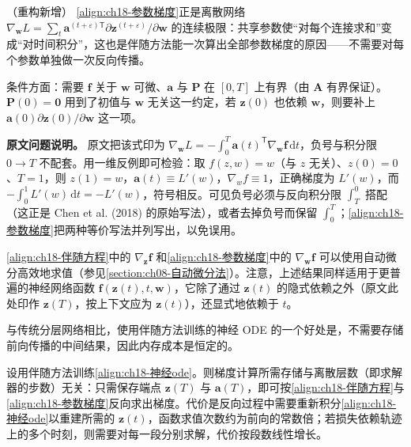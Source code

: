 \documentclass[../../main.tex]{subfiles}
\begin{document}
\begin{remark}（重构新增）
\eqref{align:ch18-参数梯度}正是离散网络 $\nabla_{\bm{w}}L=\sum_{t}\bm{a}^{(t+\varepsilon)\mathsf T}\partial\bm{z}^{(t+\varepsilon)}/\partial\bm{w}$ 的连续极限：共享参数使“对每个连接求和”变成“对时间积分”，这也是伴随方法能一次算出全部参数梯度的原因——不需要对每个参数单独做一次反向传播。

条件方面：需要 $\bm{f}$ 关于 $\bm{w}$ 可微、$\bm{a}$ 与 $\bm{P}$ 在 $[0,T]$ 上有界（由 $\bm{A}$ 有界保证）。$\bm{P}(0)=\bm{0}$ 用到了初值与 $\bm{w}$ 无关这一约定，若 $\bm{z}(0)$ 也依赖 $\bm{w}$，则要补上 $\bm{a}(0)\partial\bm{z}(0)/\partial\bm{w}$ 这一项。

\textbf{原文问题说明。} 原文把该式印为 $\nabla_{\bm{w}}L=-\int_{0}^{T}\bm{a}(t)^{\mathsf T}\nabla_{\bm{w}}\bm{f}\,\mathrm{d}t$，负号与积分限 $0\to T$ 不配套。用一维反例即可检验：取 $f(z,w)=w$（与 $z$ 无关）、$z(0)=0$、$T=1$，则 $z(1)=w$，$\bm{a}(t)\equiv L'(w)$，$\nabla_{w}f\equiv1$，正确梯度为 $L'(w)$，而 $-\int_{0}^{1}L'(w)\,\mathrm{d}t=-L'(w)$，符号相反。可见负号必须与反向积分限 $\int_{T}^{0}$ 搭配（这正是 Chen et al. (2018) 的原始写法），或者去掉负号而保留 $\int_{0}^{T}$；\eqref{align:ch18-参数梯度}把两种等价写法并列写出，以免误用。
\end{remark}

\eqref{align:ch18-伴随方程}中的 $\nabla_{\bm{z}}\bm{f}$ 和\eqref{align:ch18-参数梯度}中的 $\nabla_{\bm{w}}\bm{f}$ 可以使用自动微分高效地求值（参见\cref{section:ch08-自动微分法}）。注意，上述结果同样适用于更普遍的神经网络函数 $\bm{f}(\bm{z}(t),t,\bm{w})$，它除了通过 $\bm{z}(t)$ 的隐式依赖之外（原文此处印作 $\bm{z}(T)$，按上下文应为 $\bm{z}(t)$），还显式地依赖于 $t$。

与传统分层网络相比，使用伴随方法训练的神经 ODE 的一个好处是，不需要存储前向传播的中间结果，因此内存成本是恒定的。

\begin{proposition}[伴随方法的存储与计算代价]\label{proposition:ch18-伴随代价}
设用伴随方法训练\eqref{align:ch18-神经ode}。则梯度计算所需存储与离散层数（即求解器的步数）无关：只需保存端点 $\bm{z}(T)$ 与 $\bm{a}(T)$，即可按\eqref{align:ch18-伴随方程}与\eqref{align:ch18-参数梯度}反向求出梯度。代价是反向过程中需要重新积分\eqref{align:ch18-神经ode}以重建所需的 $\bm{z}(t)$，函数求值次数约为前向的常数倍；若损失依赖轨迹上的多个时刻，则需要对每一段分别求解，代价按段数线性增长。
\end{proposition}
\end{document}

